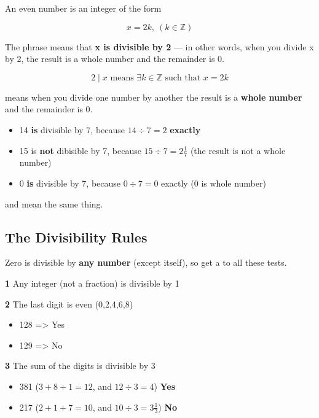 An even number is an integer of the form

\[x=2k,\ (k \in \mathbb{Z})\]

\vspace{10 mm}

The phrase  means that \textbf{x is divisible by 2} — in other words, when you divide x by 2, the result is a whole number and the remainder is 0.

\[2 \mid x \text{ means } \exists k \in \mathbb{Z} \text{ such that } x = 2k\]

 means when you divide one number by another the result is a \textbf{whole number} and the remainder is 0.

\begin{itemize}
  \item 14 \textbf{is} divisible by 7, because $14 \div 7 = 2$ \textbf{exactly}
  \item 15 is \textbf{not} dibisible by 7, because $15 \div 7 = 2\frac{1}{7}$ (the result is not a whole number)
  \item 0 \textbf{is} divisible by 7, because $0 \div 7 = 0$ exactly (0 is  whole number)
\end{itemize}

 and  mean the same thing.

\subsection{The Divisibility Rules}

Zero is divisible by \textbf{any number} (except itself), so get a  to all these tests.

\textbf{1} Any integer (not a fraction) is divisible by 1

\textbf{2} The last digit is even (0,2,4,6,8)

\begin{itemize}
  \item 128 => Yes
  \item 129 => No
\end{itemize}

\textbf{3} The sum of the digits is divisible by 3

\begin{itemize}
  \item 381 ($3+8+1=12$, and $12 \div 3 = 4$) \textbf{Yes}
  \item 217 ($2+1+7=10$, and $10 \div 3 = 3\frac{1}{3}$) \textbf{No}
\end{itemize}

